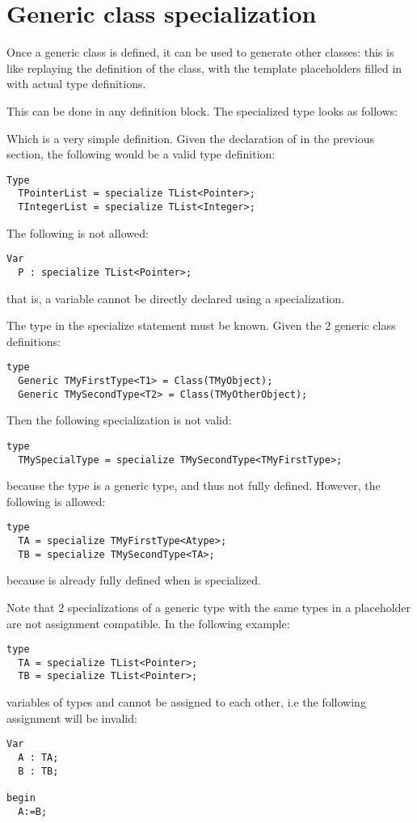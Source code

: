 \section{Generic class specialization}
Once a generic class is defined, it can be used to generate other classes:
this is like replaying the definition of the class, with the template
placeholders filled in with actual type definitions.

This can be done in any  definition block. The specialized type
looks as follows:

Which is a very simple definition. Given the declaration of  in
the previous section, the following would be a valid type definition:
\begin{verbatim}
Type
  TPointerList = specialize TList<Pointer>;
  TIntegerList = specialize TList<Integer>;
\end{verbatim}
The following is not allowed:
\begin{verbatim}
Var
  P : specialize TList<Pointer>;  
\end{verbatim}
that is, a variable cannot be directly declared using a specialization.

The type in the specialize statement must be known. Given the 2 generic
class definitions:
\begin{verbatim}
type 
  Generic TMyFirstType<T1> = Class(TMyObject);
  Generic TMySecondType<T2> = Class(TMyOtherObject);
\end{verbatim}
Then the following specialization is not valid:
\begin{verbatim}
type
  TMySpecialType = specialize TMySecondType<TMyFirstType>;
\end{verbatim}
because the type  is a generic type, and thus
not fully defined. However, the following is allowed:
\begin{verbatim}
type
  TA = specialize TMyFirstType<Atype>;
  TB = specialize TMySecondType<TA>;
\end{verbatim}
because  is already fully defined when  is specialized.

Note that 2 specializations of a generic type with the same types in a
placeholder are not assignment compatible. In the following example:
\begin{verbatim}
type
  TA = specialize TList<Pointer>;
  TB = specialize TList<Pointer>;
\end{verbatim}
variables of types  and  cannot be assigned to each other,
i.e the following assignment will be invalid:
\begin{verbatim}
Var
  A : TA;
  B : TB;

begin
  A:=B;
\end{verbatim}

